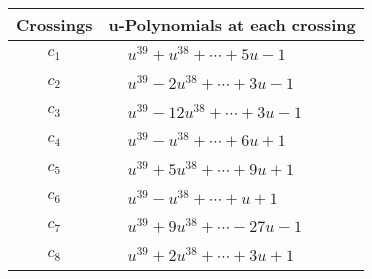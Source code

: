 \documentclass[1p]{elsarticle_modified}
\theoremstyle{definition}
\begin{document}
\begin{tabular}{m{50pt}|m{274pt}}
Crossings & \hspace{64pt}u-Polynomials at each crossing \\
\hline $$\begin{aligned}c_{1}\end{aligned}$$&$\begin{aligned}
&u^{39}+u^{38}+\cdots+5 u-1
\end{aligned}$\\
\hline $$\begin{aligned}c_{2}\end{aligned}$$&$\begin{aligned}
&u^{39}-2 u^{38}+\cdots+3 u-1
\end{aligned}$\\
\hline $$\begin{aligned}c_{3}\end{aligned}$$&$\begin{aligned}
&u^{39}-12 u^{38}+\cdots+3 u-1
\end{aligned}$\\
\hline $$\begin{aligned}c_{4}\end{aligned}$$&$\begin{aligned}
&u^{39}- u^{38}+\cdots+6 u+1
\end{aligned}$\\
\hline $$\begin{aligned}c_{5}\end{aligned}$$&$\begin{aligned}
&u^{39}+5 u^{38}+\cdots+9 u+1
\end{aligned}$\\
\hline $$\begin{aligned}c_{6}\end{aligned}$$&$\begin{aligned}
&u^{39}- u^{38}+\cdots+u+1
\end{aligned}$\\
\hline $$\begin{aligned}c_{7}\end{aligned}$$&$\begin{aligned}
&u^{39}+9 u^{38}+\cdots-27 u-1
\end{aligned}$\\
\hline $$\begin{aligned}c_{8}\end{aligned}$$&$\begin{aligned}
&u^{39}+2 u^{38}+\cdots+3 u+1
\end{aligned}$\\

\end{tabular}
\end{document}
